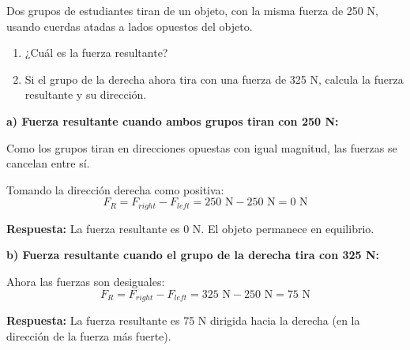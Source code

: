 \begin{exercise}
    Dos grupos de estudiantes tiran de un objeto, con la misma fuerza de 250 N, usando cuerdas atadas a lados opuestos del objeto.
    \begin{enumerate}[label=\letraminuscula]
        \item ¿Cuál es la fuerza resultante?
        \item Si el grupo de la derecha ahora tira con una fuerza de 325 N, calcula la fuerza resultante y su dirección.
    \end{enumerate}

    \begin{solu}
        \textbf{a) Fuerza resultante cuando ambos grupos tiran con 250 N:}

        Como los grupos tiran en direcciones opuestas con igual magnitud, las fuerzas se cancelan entre sí.

        Tomando la dirección derecha como positiva:
        $$F_R = F_{right} - F_{left} = 250\text{ N} - 250\text{ N} = 0\text{ N}$$

        \textbf{Respuesta:} La fuerza resultante es 0 N. El objeto permanece en equilibrio.

        \textbf{b) Fuerza resultante cuando el grupo de la derecha tira con 325 N:}

        Ahora las fuerzas son desiguales:
        $$F_R = F_{right} - F_{left} = 325\text{ N} - 250\text{ N} = 75\text{ N}$$

        \textbf{Respuesta:} La fuerza resultante es 75 N dirigida hacia la derecha (en la dirección de la fuerza más fuerte).
    \end{solu}
\end{exercise}





